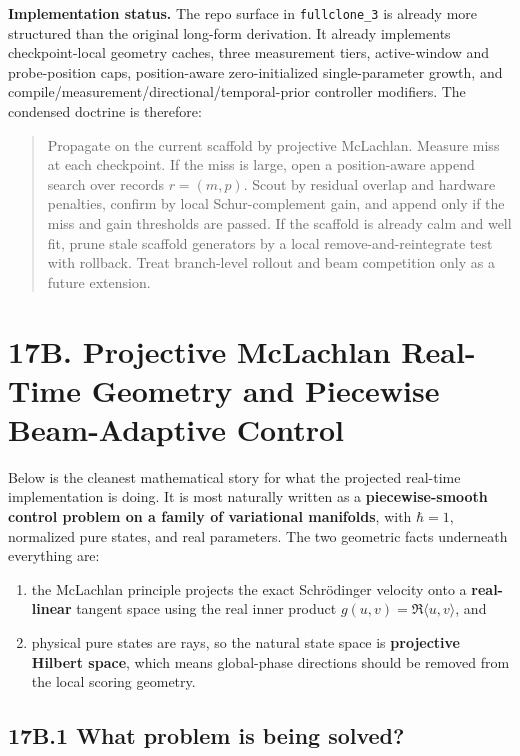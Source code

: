 \documentclass[11pt]{article}
\begin{document}
\noindent\textbf{Implementation status.} The repo surface in \texttt{fullclone\_3} is already more structured than the original long-form derivation. It already implements checkpoint-local geometry caches, three measurement tiers, active-window and probe-position caps, position-aware zero-initialized single-parameter growth, and compile/measurement/directional/temporal-prior controller modifiers. The condensed doctrine is therefore:
\begin{quote}
Propagate on the current scaffold by projective McLachlan. Measure miss at each checkpoint. If the miss is large, open a position-aware append search over records \(r=(m,p)\). Scout by residual overlap and hardware penalties, confirm by local Schur-complement gain, and append only if the miss and gain thresholds are passed. If the scaffold is already calm and well fit, prune stale scaffold generators by a local remove-and-reintegrate test with rollback. Treat branch-level rollout and beam competition only as a future extension.
\end{quote}

\newpage
\section*{17B. Projective McLachlan Real-Time Geometry and Piecewise Beam-Adaptive Control}


Below is the cleanest mathematical story for what the projected real-time implementation is doing. It is most naturally written as a \textbf{piecewise-smooth control problem on a family of variational manifolds}, with $\hbar=1$, normalized pure states, and real parameters. The two geometric facts underneath everything are:

\begin{enumerate}
\item the McLachlan principle projects the exact Schrödinger velocity onto a \textbf{real-linear} tangent space using the real inner product $g(u,v)=\Re\langle u,v\rangle$, and
\item physical pure states are rays, so the natural state space is \textbf{projective Hilbert space}, which means global-phase directions should be removed from the local scoring geometry.

\end{enumerate}

\subsection*{17B.1 What problem is being solved?}
\end{document}
